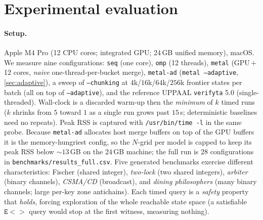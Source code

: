 \documentclass[11pt]{article}
\newcommand{\code}[1]{\texttt{\small #1}}
\begin{document}
\section{Experimental evaluation}\label{sec:eval}
\paragraph{Setup.} Apple M4 Pro (12 CPU cores; integrated GPU; 24\,GB unified memory), macOS.
We measure nine configurations: \code{seq} (one core), \code{omp} (12 threads), \code{metal}
(GPU\,$+$\,12 cores, \emph{naive} one-thread-per-bucket merge), \code{metal-ad}
(\code{metal --adaptive}, \cref{sec:adaptive}), a sweep of \code{--chunking} at $4$k/$16$k/$64$k/$256$k
frontier states per batch (all on top of \code{--adaptive}), and the reference UPPAAL \code{verifyta}
5.0 (single-threaded). Wall-clock is a discarded warm-up then the \emph{minimum} of $k$ timed runs
($k$ shrinks from $5$ toward $1$ as a single run grows past $15$\,s; deterministic baselines need no
repeats). Peak RSS is captured with \code{/usr/bin/time -l} in the same probe. Because
\code{metal-ad} allocates host merge buffers on top of the GPU buffers it is the memory-hungriest
config, so the $N$-grid per model is capped to keep its peak RSS below ${\sim}13$\,GB on the $24$\,GB
machine; the full run is $28$ configurations in \code{benchmarks/results\_full.csv}. Five generated
benchmarks exercise different characteristics: Fischer (shared integer), \emph{two-lock} (two shared
integers), \emph{arbiter} (binary channels), \emph{CSMA/CD} (broadcast), and \emph{dining
philosophers} (many binary channels; large per-key zone antichains). Each timed query is a
\emph{safety} property that \emph{holds}, forcing exploration of the whole reachable state space (a
satisfiable $\mathtt{E\!<\!>}$ query would stop at the first witness, measuring nothing).
\end{document}
